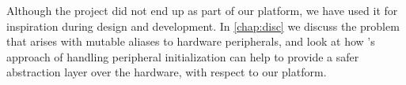 Although the {\zinc} project did not end up as part of our platform, we have used it for inspiration during design and development.
In \autoref{chap:disc} we discuss the problem that arises with mutable aliases to hardware peripherals, and look at how {\zinc}'s approach of handling peripheral initialization can help to provide a safer abstraction layer over the hardware, with respect to our platform.


